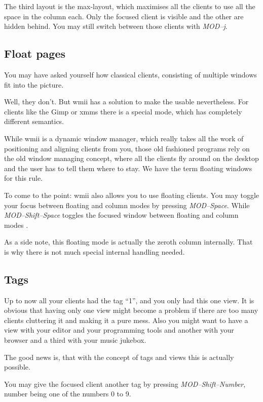 \documentclass[12pt,a4paper]{article} %
\begin{document}
    The third layout is the max-layout, which maximises all the
    clients to use all the space in the column each. Only the focused
    client is visible and the other are hidden behind. You may still
    switch between those clients with \emph{MOD--j}.

  \subsection{Float pages}

    You may have asked yourself how classical clients, consisting of
    multiple windows fit into the picture.

    Well, they don't. But wmii has a solution to make the usable
    nevertheless. For clients like the Gimp or xmms there is a special
    mode, which has completely different semantics.

    While wmii is a dynamic window manager, which really takes all the
    work of positioning and aligning clients from you, those old
    fashioned programs rely on the old window managing concept, where
    all the clients fly around on the desktop and the user has to tell
    them where to stay. We have the term floating windows for this
    rule.

    To come to the point: wmii also allows you to use floating
    clients. You may toggle your focus between floating and column 
    modes by pressing \emph{MOD--Space}. While \emph{MOD--Shift--Space}
    toggles the focused window between floating and column modes .

    As a side note, this floating mode is actually the zeroth column
    internally. That is why there is not much special internal
    handling needed.

  \subsection{Tags}

    Up to now all your clients had the tag ``1'', and you only had
    this one view. It is obvious that having only one view might
    become a problem if there are too many clients cluttering it and
    making it a pure mess. Also you might want to have a view with
    your editor and your programming tools and another with your
    browser and a third with your music jukebox.

    The good news is, that with the concept of tags and views this is
    actually possible.

    You may give the focused client another tag by pressing
    \emph{MOD--Shift--Number}, number being one of the numbers 0 to 9.
\end{document}
